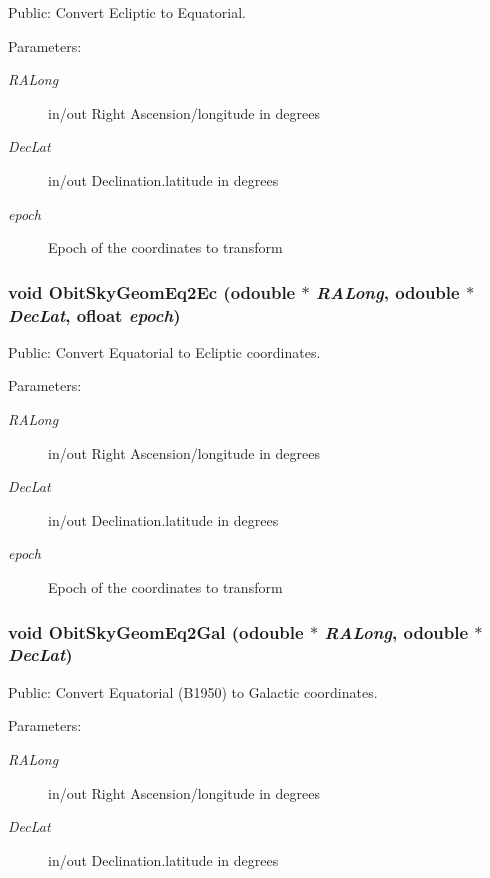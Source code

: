 Public: Convert Ecliptic to Equatorial. 

\begin{Desc}
\item[Parameters:]
\begin{description}
\item[{\em RALong}]in/out Right Ascension/longitude in degrees \item[{\em Dec\-Lat}]in/out Declination.latitude in degrees \item[{\em epoch}]Epoch of the coordinates to transform \end{description}
\end{Desc}
\subsubsection{\setlength{\rightskip}{0pt plus 5cm}void Obit\-Sky\-Geom\-Eq2Ec ({\bf odouble} $\ast$ {\em RALong}, {\bf odouble} $\ast$ {\em Dec\-Lat}, {\bf ofloat} {\em epoch})}\label{ObitSkyGeom_8c_a18}


Public: Convert Equatorial to Ecliptic coordinates. 

\begin{Desc}
\item[Parameters:]
\begin{description}
\item[{\em RALong}]in/out Right Ascension/longitude in degrees \item[{\em Dec\-Lat}]in/out Declination.latitude in degrees \item[{\em epoch}]Epoch of the coordinates to transform \end{description}
\end{Desc}
\subsubsection{\setlength{\rightskip}{0pt plus 5cm}void Obit\-Sky\-Geom\-Eq2Gal ({\bf odouble} $\ast$ {\em RALong}, {\bf odouble} $\ast$ {\em Dec\-Lat})}\label{ObitSkyGeom_8c_a16}


Public: Convert Equatorial (B1950) to Galactic coordinates. 

\begin{Desc}
\item[Parameters:]
\begin{description}
\item[{\em RALong}]in/out Right Ascension/longitude in degrees \item[{\em Dec\-Lat}]in/out Declination.latitude in degrees \end{description}
\end{Desc}
